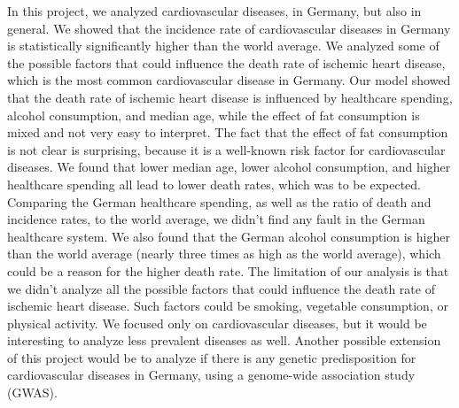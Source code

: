 
In this project, we analyzed cardiovascular diseases, in Germany, but also in general.
We showed that the incidence rate of cardiovascular diseases in Germany is statistically significantly higher than the world average.
We analyzed some of the possible factors that could influence the death rate of ischemic heart disease, which is the most common cardiovascular disease in Germany.
Our model showed that the death rate of ischemic heart disease is influenced by healthcare spending, alcohol consumption, and median age, while 
the effect of fat consumption is mixed and not very easy to interpret. The fact that the effect of fat consumption is not clear is surprising, because it is 
a well-known risk factor for cardiovascular diseases.
We found that lower median age, lower alcohol consumption, and higher healthcare spending
all lead to lower death rates, which was to be expected.
Comparing the German healthcare spending, as well as the ratio of death and incidence rates, to the world average, we didn't find any
fault in the German healthcare system. We also found that the German alcohol consumption is higher than the world average (nearly three times as high as the world average), 
which could be a reason for the higher death rate.
The limitation of our analysis is that we didn't analyze all the possible factors that could influence the death rate of ischemic heart disease. Such factors could be
smoking, vegetable consumption, or physical activity. We focused only on cardiovascular diseases, but it would be interesting to analyze less prevalent diseases as well.
Another possible extension of this project would be to analyze if there is any genetic predisposition for cardiovascular diseases in Germany, using 
a genome-wide association study (GWAS).